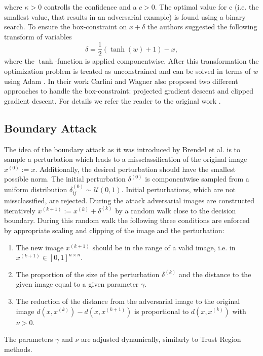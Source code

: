 \documentclass{article}
\begin{document}
where $\kappa > 0$ controlls the confidence and a $c>0$. The optimal value for c (i.e. the smallest value, that results in an adversarial example) is found using a binary search. To ensure the box-constraint on $x+\delta$ the authors suggested the following transform of variables 
\begin{equation}
	\delta = \frac{1}{2}(\tanh(w)+1)-x,
\end{equation} 
where the $\tanh$-function is applied componentwise. After this transformation the optimization problem is treated as unconstrained and can be solved in terms of $w$ using Adam \cite{adam}. In their work Carlini and Wagner also proposed two different approaches to handle the box-constraint: projected gradient descent and clipped gradient descent. For details we refer the reader to the original work \cite{carlini}.

\subsection{Boundary Attack}

The idea of the boundary attack as it was introduced by Brendel et al. \cite{boundary} is to sample a perturbation which leads to a missclassification of the original image $x^{(0)}:=x$. Additionally, the desired perturbation should have the smallest possible norm. The initial perturbation $\delta^{(0)}$ is componentwise sampled from a uniform distribution $\delta^{(0)}_{ij}\sim \mathcal{U}(0,1)$. Initial perturbations, which are not missclassified, are rejected. During the attack adversarial images are constructed iteratively $x^{(k+1)}:= x^{(k)}+\delta^{(k)}$ by a random walk close to the decision boundary. During this random walk the following three conditions are enforced by appropriate scaling and clipping of the image and the perturbation:
\begin{enumerate}
	\item The new image $x^{(k+1)}$ should be in the range of a valid image, i.e. in $x^{(k+1)}\in [0,1]^{n\times n}$.
	\item The proportion of the size of the perturbation $\delta^{(k)}$ and the distance to the given image equal to a given parameter $\gamma$.
	\item The reduction of the distance from the adversarial image to the original image $d(x, x^{(k)})-d(x, x^{(k+1)})$ is proportional to $d(x, x^{(k)})$ with $\nu>0$.
\end{enumerate}
The parameters $\gamma$ and $\nu$ are adjusted dynamically, similarly to Trust Region methods.
\end{document}
